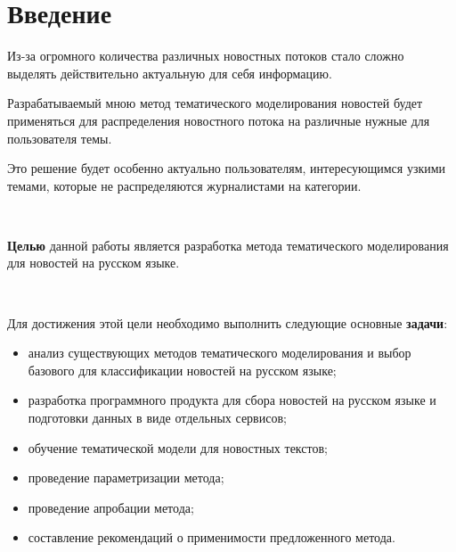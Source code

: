 \chapter{Введение}

Из-за огромного количества различных новостных потоков стало сложно выделять действительно актуальную для себя информацию. 

Разрабатываемый мною метод тематического моделирования новостей будет применяться для распределения новостного потока на различные нужные для пользователя темы.

Это решение будет особенно актуально пользователям, интересующимся узкими темами, которые не распределяются журналистами на категории.

~\

\textbf{Целью} данной работы является разработка метода тематического моделирования для новостей на русском языке.

~\

Для достижения этой цели необходимо выполнить следующие основные \textbf{задачи}:

\begin{itemize}
    \item анализ существующих методов тематического моделирования и выбор базового для классификации новостей на русском языке;
    \item разработка программного продукта для сбора новостей на русском языке и подготовки данных в виде отдельных сервисов;
    \item обучение тематической модели для новостных текстов;
    \item проведение параметризации метода;
    \item проведение апробации метода;
    \item составление рекомендаций о применимости предложенного метода.
\end{itemize}


